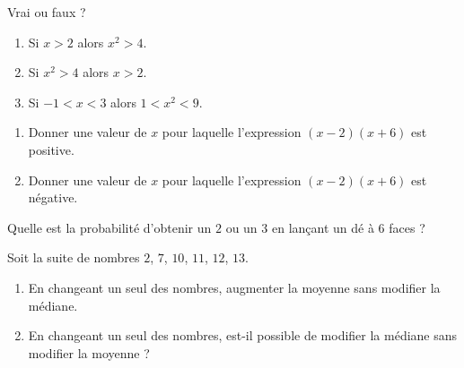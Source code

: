 \begin{MentalActivity}
    \begin{mental}
        Vrai ou faux ?
        \begin{enumerate}
            \item
                Si \( x>2 \) alors \( x^2>4\).
            \item
                Si \( x^2>4\) alors \( x>2\).
            \item
                Si \( -1<x<3\) alors \( 1<x^2<9\).
        \end{enumerate}
    \end{mental}
    \begin{mental}
        \begin{enumerate}
            \item
                Donner une valeur de \( x\) pour laquelle l'expression \( (x-2)(x+6)\) est positive.
            \item
                Donner une valeur de \( x\) pour laquelle l'expression \( (x-2)(x+6)\) est négative.
        \end{enumerate}
    \end{mental}
    \begin{mental}
        Quelle est la probabilité d'obtenir un \( 2\) ou un \( 3\) en lançant un dé à \( 6\) faces ?
    \end{mental}
    \begin{mental}
        Soit la suite de nombres \( 2\), \( 7\), \( 10\), \( 11\), \( 12\), \( 13\).
        \begin{enumerate}
            \item
                En changeant un seul des nombres, augmenter la moyenne sans modifier la médiane.
            \item
                En changeant un seul des nombres, est-il possible de modifier la médiane sans modifier la moyenne ?
        \end{enumerate}
    \end{mental}
\end{MentalActivity}
